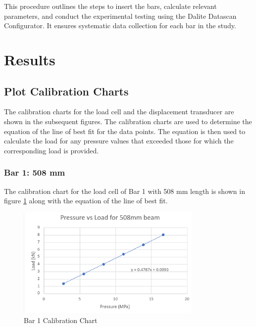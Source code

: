 \documentclass[12pt, titlepage]{article}
\begin{document}
This procedure outlines the steps to insert the bars, calculate relevant
parameters, and conduct the experimental testing using the Dalite Datascan
Configurator. It ensures systematic data collection for each bar in the study.
\newpage
\section{Results}
\subsection{Plot Calibration Charts}
The calibration charts for the load cell and the displacement transducer are
shown in the subsequent figures. The calibration charts are used to determine
the equation of the line of best fit for the data points. The equation is then
used to calculate the load for any pressure values that exceeded those for
which the corresponding load is provided.
\subsubsection{Bar 1: 508 mm}
The calibration chart for the load cell of Bar 1 with 508 mm length is shown
in figure \ref{fig:bar1calib} along with the equation of the line of best fit.
\begin{figure}[H]
    \centering
    \includegraphics[width=0.8\textwidth]{./Images/508.png}
    \caption{Bar 1 Calibration Chart}
    \label{fig:bar1calib}
\end{figure}
\end{document}
